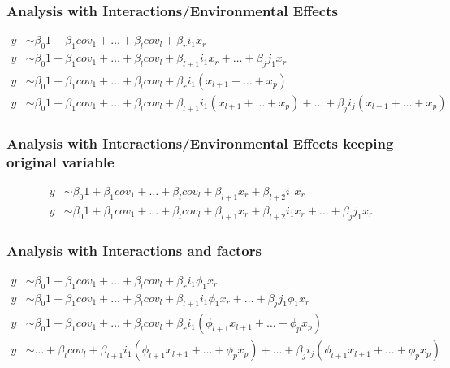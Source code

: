 \subsubsection{Analysis with Interactions/Environmental Effects}
\begin{align}
y &\sim \beta_0 1 + \beta_1 cov_1 + \dots + \beta_l cov_l + \beta_r i_1 x_r\\
y &\sim \beta_0 1 + \beta_1 cov_1 + \dots + \beta_l cov_l + \beta_{l+1} i_1 x_r + \dots  + \beta_j j_1 x_r\\
y &\sim \beta_0 1 + \beta_1 cov_1 + \dots + \beta_l cov_l + \beta_{r}  i_1 \left( x_{l+1}  + \dots + x_p\right) \\
y &\sim \beta_0 1 + \beta_1 cov_1 + \dots + \beta_l cov_l + \beta_{l+1}  i_1 \left( x_{l+1}  + \dots + x_p\right) +\dots + \beta_{j}  i_j \left( x_{l+1}  + \dots + x_p\right)
\end{align}

\subsubsection{Analysis with Interactions/Environmental Effects keeping original variable}
\begin{align}
y &\sim\beta_0 1 + \beta_1 cov_1 + \dots + \beta_l cov_l +  \beta_{l+1} x_r +  \beta_{l+2} i_1 x_r\\
y &\sim \beta_0 1 + \beta_1 cov_1 + \dots + \beta_l cov_l + \beta_{l+1} x_r + \beta_{l+2} i_1 x_r + \dots  + \beta_j j_1 x_r
\end{align}

\subsubsection{Analysis with Interactions and factors}
\begin{align}
y &\sim \beta_0 1 + \beta_1 cov_1 + \dots + \beta_l cov_l + \beta_r i_1 \phi_1 x_r\\
y &\sim \beta_0 1 + \beta_1 cov_1 + \dots + \beta_l cov_l + \beta_{l+1} i_1 \phi_1 x_r + \dots  + \beta_j j_1 \phi_1 x_r\\
y &\sim \beta_0 1 + \beta_1 cov_1 + \dots + \beta_l cov_l + \beta_{r}  i_1 \left( \phi_{l+1} x_{l+1}  + \dots + \phi_p x_p\right) \\
y &\sim  \dots + \beta_l cov_l + \beta_{l+1}  i_1 \left(  \phi_{l+1} x_{l+1}  + \dots +  \phi_{p} x_p\right) +\dots + \beta_{j}  i_j \left( \phi_{l+1} x_{l+1}  + \dots + \phi_{p} x_p\right)
\end{align}

